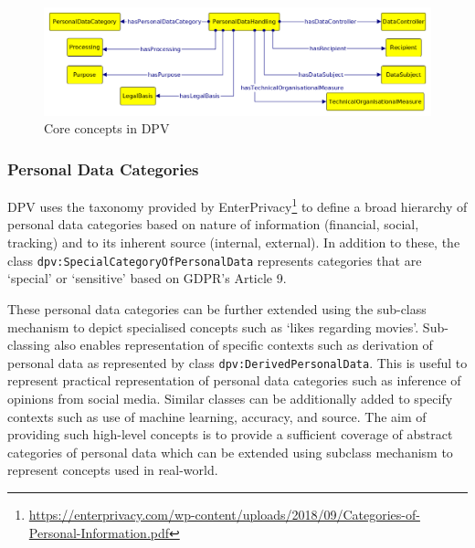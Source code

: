 \begin{figure}[htbp]
    \centering
    \includegraphics[width=\linewidth]{img/dpv-personaldatahandling.png}
    \caption{Core concepts in DPV \cite{pandit_creating_2019}}
    \label{fig:vocabs:dpv-core}
\end{figure}

\subsubsection{Personal Data Categories}
DPV uses the taxonomy provided by EnterPrivacy\footnote{\url{https://enterprivacy.com/wp-content/uploads/2018/09/Categories-of-Personal-Information.pdf}} to define a broad hierarchy of personal data categories based on nature of information (financial, social, tracking) and to its inherent source (internal, external). 
In addition to these, the class \texttt{dpv:Special\-Category\-Of\-PersonalData} represents categories that are `special' or `sensitive' based on GDPR’s Article 9.

These personal data categories can be further extended using the sub-class mechanism to depict specialised concepts such as `likes regarding movies'.
Sub-classing also enables representation of specific contexts such as derivation of personal data as represented by class \texttt{dpv:DerivedPersonalData}.
This is useful to represent practical representation of personal data categories such as inference of opinions from social media.
Similar classes can be additionally added to specify contexts such as use of machine learning, accuracy, and source.
The aim of providing such high-level concepts is to provide a sufficient coverage of abstract categories of personal data which can be extended using subclass mechanism to represent concepts used in real-world. 

